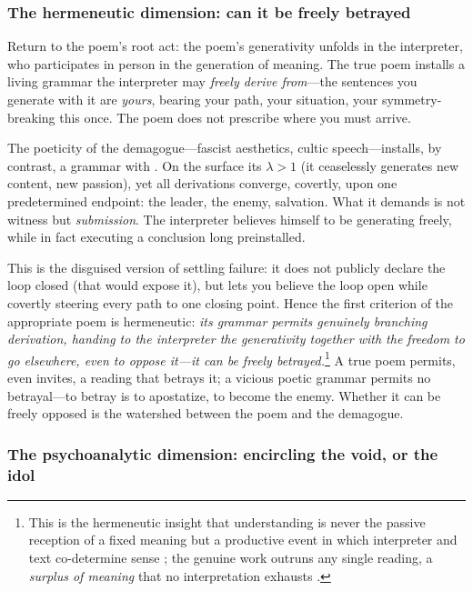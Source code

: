 \subsubsection{The hermeneutic dimension: can it be freely betrayed}

Return to the poem's root act: the poem's generativity unfolds in the interpreter, who participates in person in the generation of meaning. The true poem installs a living grammar the interpreter may \emph{freely derive from}---the sentences you generate with it are \emph{yours}, bearing your path, your situation, your symmetry-breaking this once. The poem does not prescribe where you must arrive.

The poeticity of the demagogue---fascist aesthetics, cultic speech---installs, by contrast, a grammar with . On the surface its $\lambda>1$ (it ceaselessly generates new content, new passion), yet all derivations converge, covertly, upon one predetermined endpoint: the leader, the enemy, salvation. What it demands is not witness but \emph{submission}. The interpreter believes himself to be generating freely, while in fact executing a conclusion long preinstalled.

\begin{claim}
This is the disguised version of settling failure: it does not publicly declare the loop closed (that would expose it), but lets you believe the loop open while covertly steering every path to one closing point. Hence the first criterion of the appropriate poem is hermeneutic: \emph{its grammar permits genuinely branching derivation, handing to the interpreter the generativity together with the freedom to go elsewhere, even to oppose it---it can be freely betrayed.}\footnote{This is the hermeneutic insight that understanding is never the passive reception of a fixed meaning but a productive event in which interpreter and text co-determine sense \parencite{gadamer2004}; the genuine work outruns any single reading, a \emph{surplus of meaning} that no interpretation exhausts \parencite{ricoeur1976}.} A true poem permits, even invites, a reading that betrays it; a vicious poetic grammar permits no betrayal---to betray is to apostatize, to become the enemy. Whether it can be freely opposed is the watershed between the poem and the demagogue.
\end{claim}

\subsubsection{The psychoanalytic dimension: encircling the void, or the idol}

